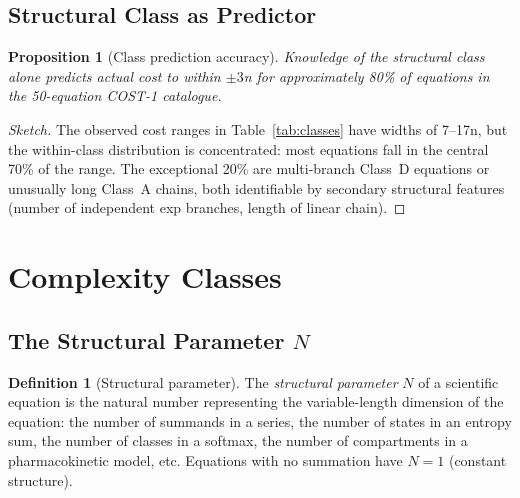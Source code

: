 \documentclass[12pt,a4paper]{article}
\newtheorem{proposition}[theorem]{Proposition}
\theoremstyle{definition}
\newtheorem{definition}[theorem]{Definition}
\begin{document}
\subsection{Structural Class as Predictor}

\begin{proposition}[Class prediction accuracy]
\label{prop:class-pred}
Knowledge of the structural class alone predicts actual cost to within $\pm 3$n
for approximately 80\% of equations in the 50-equation COST-1 catalogue.
\end{proposition}

\begin{proof}[Sketch]
The observed cost ranges in Table~\ref{tab:classes} have widths of 7--17n, but
the within-class distribution is concentrated: most equations fall in the
central 70\% of the range.  The exceptional 20\% are multi-branch Class~D
equations or unusually long Class~A chains, both identifiable by secondary
structural features (number of independent exp branches, length of linear chain).
\end{proof}

\section{Complexity Classes}
\label{sec:complexity}

\subsection{The Structural Parameter \texorpdfstring{$N$}{N}}

\begin{definition}[Structural parameter]
\label{def:N}
The \emph{structural parameter} $N$ of a scientific equation is the natural
number representing the variable-length dimension of the equation: the number
of summands in a series, the number of states in an entropy sum, the number of
classes in a softmax, the number of compartments in a pharmacokinetic model,
etc.  Equations with no summation have $N = 1$ (constant structure).
\end{definition}

\end{document}
